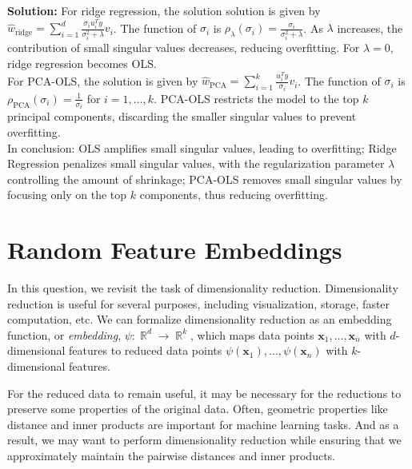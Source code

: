 \documentclass{article}
\newcommand{\Question}[1]{\Large \section{ #1 } \normalsize}
\DeclareMathOperator{\R}{\mathbb{R}}
\renewcommand{\vec}[1]{\boldsymbol{\mathbf{#1}}}
\newenvironment{solution}{\color{blue} \smallskip \textbf{Solution:}}{}
\begin{document}
\begin{enumerate}
\begin{solution}
For ridge regression, the solution solution is given by \( \hat{w}_{\text{ridge}} = \sum_{i=1}^{d} \frac{\sigma_i u_i^T y}{\sigma_i^2 + \lambda} v_i \). The function of \(\sigma_i\) is \( \rho_{\lambda}(\sigma_i) = \frac{\sigma_i}{\sigma_i^2 + \lambda} \). As \(\lambda\) increases, the contribution of small singular values decreases, reducing overfitting. For \(\lambda = 0\), ridge regression becomes OLS.\\

For PCA-OLS, the solution is given by \( \hat{w}_{\text{PCA}} = \sum_{i=1}^{k} \frac{u_i^T y}{\sigma_i} v_i \). The function of \(\sigma_i\) is \( \rho_{\text{PCA}}(\sigma_i) = \frac{1}{\sigma_i} \) for \(i = 1, \dots, k\). PCA-OLS restricts the model to the top \(k\) principal components, discarding the smaller singular values to prevent overfitting.\\

In conclusion: OLS amplifies small singular values, leading to overfitting; Ridge Regression penalizes small singular values, with the regularization parameter \(\lambda\) controlling the amount of shrinkage; PCA-OLS removes small singular values by focusing only on the top \(k\) components, thus reducing overfitting.




\end{solution}
\end{enumerate}


\newpage
\Question {Random Feature Embeddings}

\newcommand{\num}{n}
\newcommand{\dims}{d}

In this question, we revisit the task of dimensionality reduction.
Dimensionality reduction is useful for several purposes, including visualization, storage, faster computation, etc. We can formalize dimensionality reduction as an embedding function, or \emph{embedding}, $\psi: \R^d \to \R^k$, which maps data points $\vec x_1,\dots,\vec x_n$ with $d$-dimensional features to reduced data points $\psi(\vec x_1),\dots,\psi(\vec x_n)$ with $k$-dimensional features. 


For the reduced data to remain useful, it may be necessary for the reductions to preserve some properties of the original data.
Often, geometric properties like distance and inner products
are important for machine learning tasks.
And as a result, we may want to perform dimensionality reduction
while ensuring that we approximately maintain the pairwise distances
and inner products.
\end{document}
